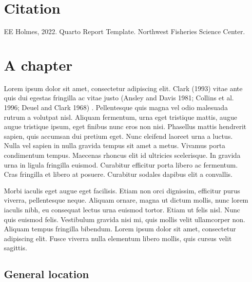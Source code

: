 \documentclass[
  letterpaper,
  oneside,
  open=any]{scrbook}
\renewcommand*\contentsname{Table of contents}
\newcommand\contentsname{Table of contents}
\begin{document}
\renewcommand*\contentsname{Table of contents}
{
\setcounter{tocdepth}{1}
\tableofcontents
}
\listoffigures
\listoftables
\mainmatter
{}

\hypertarget{citation}{%
\chapter*{Citation}\label{citation}}


EE Holmes, 2022. Quarto Report Template. Northwest Fisheries Science
Center.


\hypertarget{a-chapter}{%
\chapter{A chapter}\label{a-chapter}}

Lorem ipsum dolor sit amet, consectetur adipiscing elit. Clark (1993)
vitae ante quis dui egestas fringilla ac vitae justo (Ansley and Davis
1981; Collins et al. 1996; Deuel and Clark 1968) . Pellentesque quis
magna vel odio malesuada rutrum a volutpat nisl. Aliquam fermentum, urna
eget tristique mattis, augue augue tristique ipsum, eget finibus nunc
eros non nisi. Phasellus mattis hendrerit sapien, quis accumsan dui
pretium eget. Nunc eleifend laoreet urna a luctus. Nulla vel sapien in
nulla gravida tempus sit amet a metus. Vivamus porta condimentum tempus.
Maecenas rhoncus elit id ultricies scelerisque. In gravida urna in
ligula fringilla euismod. Curabitur efficitur porta libero ac fermentum.
Cras fringilla et libero at posuere. Curabitur sodales dapibus elit a
convallis.

Morbi iaculis eget augue eget facilisis. Etiam non orci dignissim,
efficitur purus viverra, pellentesque neque. Aliquam ornare, magna ut
dictum mollis, nunc lorem iaculis nibh, eu consequat lectus urna euismod
tortor. Etiam ut felis nisl. Nunc quis euismod felis. Vestibulum gravida
nisi mi, quis mollis velit ullamcorper non. Aliquam tempus fringilla
bibendum. Lorem ipsum dolor sit amet, consectetur adipiscing elit. Fusce
viverra nulla elementum libero mollis, quis cursus velit sagittis.

\hypertarget{general-location}{%
\section{General location}\label{general-location}}
\end{document}
